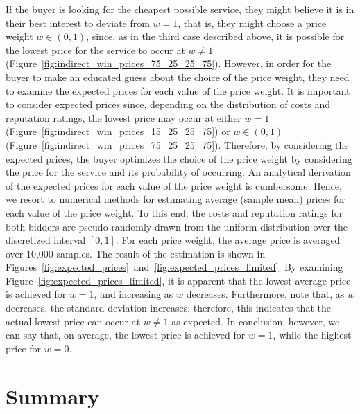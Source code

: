 If the buyer is looking for the cheapest possible service, they might believe it is in their best interest to deviate from $w=1$, that is, they might choose a price weight $w\in(0,1)$, since, as in the third case described above, it is possible for the lowest price for the service to occur at $w\neq 1$ (Figure~\ref{fig:indirect_win_prices_75_25_25_75}). However, in order for the buyer to make an educated guess about the choice of the price weight, they need to examine the expected prices for each value of the price weight. It is important to consider expected prices since, depending on the distribution of costs and reputation ratings, the lowest price may occur at either $w=1$ (Figure~\ref{fig:indirect_win_prices_15_25_25_75}) or $w\in(0,1)$ (Figure~\ref{fig:indirect_win_prices_75_25_25_75}). Therefore, by considering the expected prices, the buyer optimizes the choice of the price weight by considering the price for the service and its probability of occurring. An analytical derivation of the expected prices for each value of the price weight is cumbersome. Hence, we resort to numerical methods for estimating average (sample mean) prices for each value of the price weight. To this end, the costs and reputation ratings for both bidders are pseudo-randomly drawn from the uniform distribution over the discretized interval $[0,1]$. For each price weight, the average price is averaged over 10,000 samples. The result of the estimation is shown in Figures~\ref{fig:expected_prices}~and~\ref{fig:expected_prices_limited}. By examining Figure~\ref{fig:expected_prices_limited}, it is apparent that the lowest average price is achieved for $w=1$, and increasing as $w$ decreases. Furthermore, note that, as $w$ decreases, the standard deviation increases; therefore, this indicates that the actual lowest price can occur at $w\neq 1$ as expected. In conclusion, however, we can say that, on average, the lowest price is achieved for $w=1$, while the highest price for $w=0$.

\section{Summary} %
\label{sec:summary_ch2}


